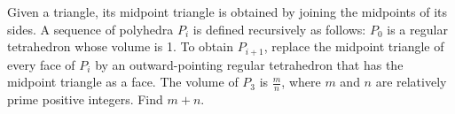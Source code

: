 Given a triangle, its midpoint triangle is obtained by joining the midpoints of its sides. A sequence of polyhedra $P_{i}$ is defined recursively as follows: $P_{0}$ is a regular tetrahedron whose volume is 1. To obtain $P_{i+1}$, replace the midpoint triangle of every face of $P_{i}$ by an outward-pointing regular tetrahedron that has the midpoint triangle as a face. The volume of $P_{3}$ is $\frac{m}{n}$, where $m$ and $n$ are relatively prime positive integers. Find $m+n$.